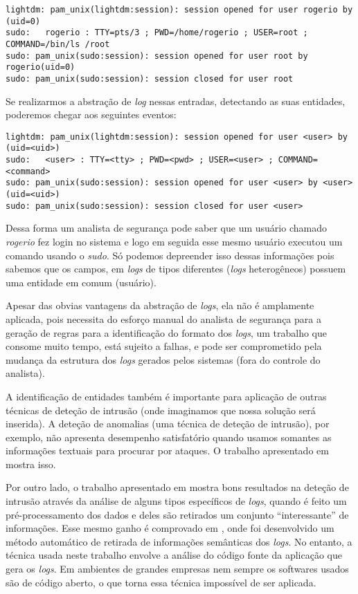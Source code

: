 \documentclass[
	12pt,				%
	openright,			%
	twoside,			%
	a4paper,			%
	english,			%
	spanish,			%
	brazil,				%
	]{abntex2}
\begin{document}
{\small
\begin{verbatim}
lightdm: pam_unix(lightdm:session): session opened for user rogerio by (uid=0)
sudo:   rogerio : TTY=pts/3 ; PWD=/home/rogerio ; USER=root ; COMMAND=/bin/ls /root
sudo: pam_unix(sudo:session): session opened for user root by rogerio(uid=0)
sudo: pam_unix(sudo:session): session closed for user root
\end{verbatim}
}

Se realizarmos a abstração de \emph{log} nessas entradas, detectando as suas entidades, poderemos chegar aos seguintes eventos:

{\small
\begin{verbatim}
lightdm: pam_unix(lightdm:session): session opened for user <user> by (uid=<uid>)
sudo:   <user> : TTY=<tty> ; PWD=<pwd> ; USER=<user> ; COMMAND=<command>
sudo: pam_unix(sudo:session): session opened for user <user> by <user>(uid=<uid>)
sudo: pam_unix(sudo:session): session closed for user <user>
\end{verbatim}
}

Dessa forma um analista de segurança pode saber que um usuário chamado \emph{rogerio} fez login no sistema e logo em seguida esse mesmo usuário executou um comando usando o \emph{sudo}. Só podemos depreender isso dessas informações pois sabemos que os campos, em \emph{logs} de tipos diferentes (\emph{logs} heterogêneos) possuem uma entidade em comum (usuário).

Apesar das obvias vantagens da abstração de \emph{logs}, ela não é amplamente aplicada, pois necessita do esforço manual do analista de segurança para a geração de regras para a identificação do formato dos \emph{logs}, um trabalho que consome muito tempo, está sujeito a falhas, e pode ser comprometido pela mudança da estrutura dos \emph{logs} gerados pelos sistemas (fora do controle do analista).

A identificação de entidades também é importante para aplicação de outras técnicas de deteção de intrusão (onde imaginamos que nossa solução será inserida). A deteção de anomalias (uma técnica de deteção de intrusão), por exemplo, não apresenta desempenho satisfatório quando usamos somantes as informações textuais para procurar por ataques. O trabalho apresentado em \cite{li2013automatic} mostra isso.

Por outro lado, o trabalho apresentado em \cite{yen2013beehive} mostra bons resultados na deteção de intrusão através da análise de alguns tipos específicos de \emph{logs}, quando é feito um pré-processamento dos dados e deles são retirados um conjunto ``interessante'' de informações. Esse mesmo ganho é comprovado em \cite{xu2009detecting}, onde foi desenvolvido um método automático de retirada de informações semânticas dos \emph{logs}. No entanto, a técnica usada neste trabalho envolve a análise do código fonte da aplicação que gera os \emph{logs}. Em ambientes de grandes empresas nem sempre os softwares usados são de código aberto, o que torna essa técnica impossível de ser aplicada.
\end{document}
